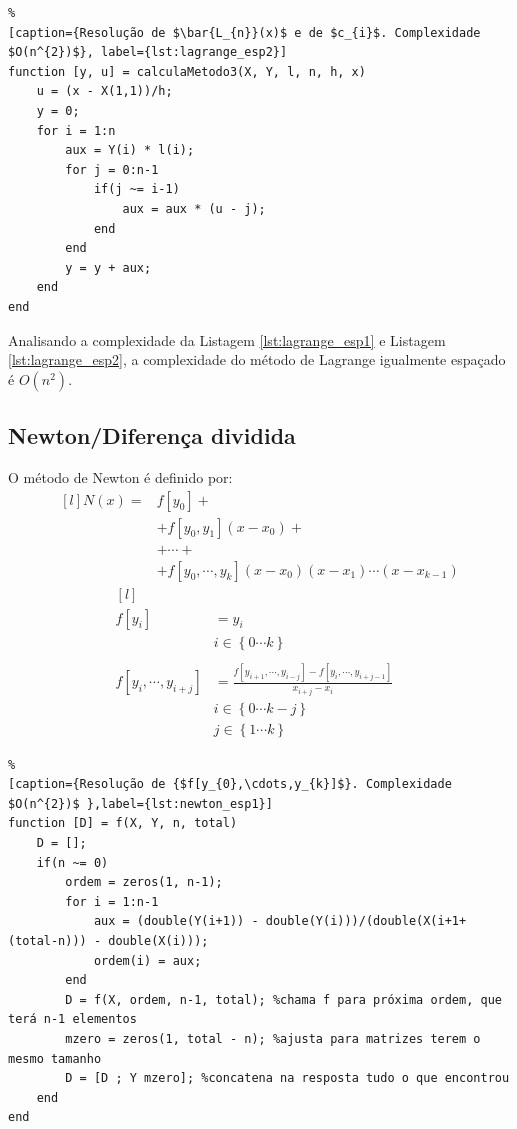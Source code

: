 \documentclass[conference]{IEEEtran}
\begin{document}
\begin{lstlisting}%
[caption={Resolução de $\bar{L_{n}}(x)$ e de $c_{i}$. Complexidade $O(n^{2})$}, label={lst:lagrange_esp2}]
function [y, u] = calculaMetodo3(X, Y, l, n, h, x)
    u = (x - X(1,1))/h;
    y = 0;
    for i = 1:n
        aux = Y(i) * l(i);
        for j = 0:n-1
            if(j ~= i-1)
                aux = aux * (u - j);
            end
        end
        y = y + aux;
    end
end
\end{lstlisting}
Analisando a complexidade da Listagem \ref{lst:lagrange_esp1} e Listagem \ref{lst:lagrange_esp2}, a complexidade do método de Lagrange igualmente espaçado é $O(n^{2})$.

\subsection{Newton/Diferença dividida} \label{subsec:newton}
O método de Newton é definido por:
$$
\begin{matrix*}[l]
N(x) =  & f[y_{0}] + \\ 
        & + f[y_{0}, y_{1}](x - x_{0}) +\\ 
        & + \cdots + \\ 
        & + f[y_{0}, \cdots ,y_{k}](x-x_{0})(x-x_{1})\cdots(x-x_{k-1}) 
\end{matrix*}
$$
$$
\begin{matrix*}[l]
\\f[y_{i}] &  = y_{i} \\ & i \in \left \{ 0 \cdots k  \right \}  & 
\\ & & 
\\f[y_{i}, \cdots, y_{i+j}] & = \frac{f[y_{i+1},\cdots, y_{i- j}] - f[y_{i},\cdots, y_{i+j-1}] }{x_{i+j} - x_{i}} \\ &  i \in \left \{ 0 \cdots k-j  \right \} 
\\ &  j \in \left \{ 1 \cdots k  \right \}
\end{matrix*}
$$

\begin{lstlisting}%
[caption={Resolução de {$f[y_{0},\cdots,y_{k}]$}. Complexidade $O(n^{2})$ },label={lst:newton_esp1}]
function [D] = f(X, Y, n, total)
    D = [];
    if(n ~= 0)
        ordem = zeros(1, n-1);
        for i = 1:n-1
            aux = (double(Y(i+1)) - double(Y(i)))/(double(X(i+1+(total-n))) - double(X(i)));
            ordem(i) = aux;
        end
        D = f(X, ordem, n-1, total); %chama f para próxima ordem, que terá n-1 elementos
        mzero = zeros(1, total - n); %ajusta para matrizes terem o mesmo tamanho
        D = [D ; Y mzero]; %concatena na resposta tudo o que encontrou
    end
end
\end{lstlisting}
\end{document}
